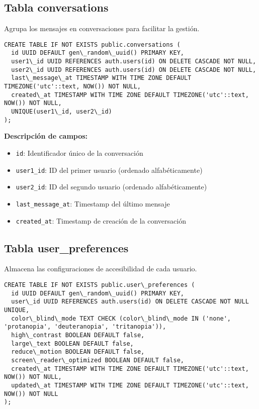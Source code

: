\documentclass[12pt,a4paper]{article}
\begin{document}
\subsection{Tabla conversations}

Agrupa los mensajes en conversaciones para facilitar la gestión.

\begin{lstlisting}[caption=Estructura completa de conversations]
CREATE TABLE IF NOT EXISTS public.conversations (
  id UUID DEFAULT gen\_random\_uuid() PRIMARY KEY,
  user1\_id UUID REFERENCES auth.users(id) ON DELETE CASCADE NOT NULL,
  user2\_id UUID REFERENCES auth.users(id) ON DELETE CASCADE NOT NULL,
  last\_message\_at TIMESTAMP WITH TIME ZONE DEFAULT TIMEZONE('utc'::text, NOW()) NOT NULL,
  created\_at TIMESTAMP WITH TIME ZONE DEFAULT TIMEZONE('utc'::text, NOW()) NOT NULL,
  UNIQUE(user1\_id, user2\_id)
);
\end{lstlisting}

\textbf{Descripción de campos:}
\begin{itemize}
    \item \texttt{id}: Identificador único de la conversación
    \item \texttt{user1\_id}: ID del primer usuario (ordenado alfabéticamente)
    \item \texttt{user2\_id}: ID del segundo usuario (ordenado alfabéticamente)
    \item \texttt{last\_message\_at}: Timestamp del último mensaje
    \item \texttt{created\_at}: Timestamp de creación de la conversación
\end{itemize}

\subsection{Tabla user\_preferences}

Almacena las configuraciones de accesibilidad de cada usuario.

\begin{lstlisting}[caption=Estructura completa de user\_preferences]
CREATE TABLE IF NOT EXISTS public.user\_preferences (
  id UUID DEFAULT gen\_random\_uuid() PRIMARY KEY,
  user\_id UUID REFERENCES auth.users(id) ON DELETE CASCADE NOT NULL UNIQUE,
  color\_blind\_mode TEXT CHECK (color\_blind\_mode IN ('none', 'protanopia', 'deuteranopia', 'tritanopia')),
  high\_contrast BOOLEAN DEFAULT false,
  large\_text BOOLEAN DEFAULT false,
  reduce\_motion BOOLEAN DEFAULT false,
  screen\_reader\_optimized BOOLEAN DEFAULT false,
  created\_at TIMESTAMP WITH TIME ZONE DEFAULT TIMEZONE('utc'::text, NOW()) NOT NULL,
  updated\_at TIMESTAMP WITH TIME ZONE DEFAULT TIMEZONE('utc'::text, NOW()) NOT NULL
);
\end{lstlisting}
\end{document}
